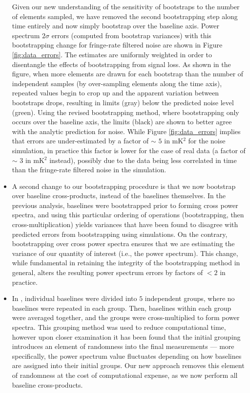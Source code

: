 \documentclass[preprint2,numberedappendix,tighten]{aastex6}  %
\begin{document}
\begin{itemize}
{Given our new understanding of the sensitivity of bootstraps to the number of elements sampled, we have removed the second 
bootstrapping step along time entirely and now simply bootstrap over the baseline axis. Power spectrum $2\sigma$ errors (computed from bootstrap variances) with this bootstrapping change for fringe-rate filtered noise are shown in Figure 
\ref{fig:data_errors}. The estimates are uniformly weighted in order to disentangle the effects of bootstrapping from signal loss. As 
shown in the figure, when more elements are drawn for each bootstrap than the number of 
independent samples (by over-sampling elements along the time axis), repeated values begin to crop up and the apparent variation between bootstraps drops, resulting in limits (gray) below the predicted noise level (green). Using the revised bootstrapping method, where bootstrapping only occurs over the baseline axis, the limits (black) are shown to better agree with the analytic prediction for noise. While Figure \ref{fig:data_errors} implies that errors are under-estimated by a factor of $\sim$ $5$ in mK$^{2}$ for the noise simulation, in practice this factor is lower for the case of real data (a factor of $\sim$ $3$ in mK$^{2}$ instead), possibly due to the data being less correlated in time than the fringe-rate filtered noise in the simulation. }%

\item{A second change to our bootstrapping procedure is that we now bootstrap over baseline cross-products, instead of the baselines themselves. In the previous analysis, baselines were bootstrapped prior to forming cross power spectra, and using this particular ordering of operations (bootstrapping, then cross-multiplication) yields variances that have been found to disagree with predicted errors from bootstrapping using simulations. On the contrary, bootstrapping over cross power spectra ensures that we are estimating the variance of our quantity of interest (i.e., the power spectrum). This change, while fundamental in retaining the integrity of the bootstrapping method in general, alters the resulting power spectrum errors by factors of $<2$ in practice.}

\item{In , individual baselines were divided into $5$ independent groups, where no baselines were repeated in each group. Then, baselines within each group were averaged together, and the groups were cross-multiplied to form power spectra. This grouping method was used to reduce computational time, however upon closer examination it has been found that the initial grouping introduces an element of randomness into the final measurements --- more specifically, the power spectrum value fluctuates depending on how baselines are assigned into their initial groups. Our new approach removes this element of randomness at the cost of computational expense, as we now perform all baseline cross-products.}


\end{itemize}
\end{document}
